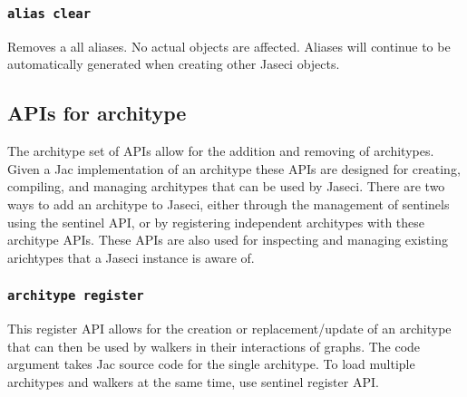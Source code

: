 \subsubsection{\lstinline[basicstyle=\Large\ttfamily]$alias clear$}

{Removes a all aliases. No actual objects are affected. Aliases will
continue to be automatically generated when creating other Jaseci
objects.\vspace{4mm}\par
{}}
\subsection{APIs for architype}

\par
The architype set of APIs allow for the addition and removing of
architypes. Given a Jac implementation of an architype these APIs are
designed for creating, compiling, and managing architypes that can be
used by Jaseci. There are two ways to add an architype to Jaseci, either
through the management of sentinels using the sentinel API, or by
registering independent architypes with these architype APIs. These
APIs are also used for inspecting and managing existing arichtypes that
a Jaseci instance is aware of.

\subsubsection{\lstinline[basicstyle=\Large\ttfamily]$architype register$}

{This register API allows for the creation or replacement/update of
an architype that can then be used by walkers in their interactions
of graphs. The code argument takes Jac source code for the single
architype. To load multiple architypes and walkers at the same time,
use sentinel register API.\vspace{4mm}\par
{}\vspace{4mm}\par
{}}
